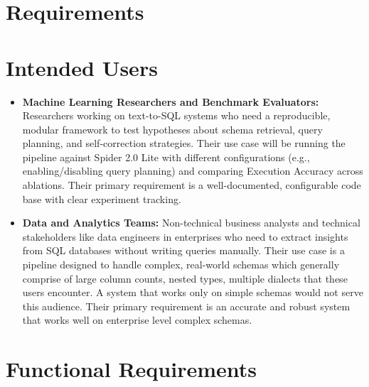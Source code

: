 \section*{\Huge Requirements}

\section{Intended Users}

\begin{itemize}
    \item \textbf{Machine Learning Researchers and Benchmark Evaluators:}
Researchers working on text-to-SQL systems who need a reproducible, modular framework to test hypotheses about schema retrieval, query planning, and self-correction strategies. Their use case will be running the pipeline against Spider 2.0 Lite \cite{lei2024spider} with different configurations (e.g., enabling/disabling query planning) and comparing Execution Accuracy across ablations. Their primary requirement is a well-documented, configurable code base with clear experiment tracking.

\item \textbf{Data and Analytics Teams: }
Non-technical business analysts and technical stakeholders like data engineers in enterprises who need to extract insights from SQL databases without writing queries manually. Their use case is a pipeline designed to handle complex, real-world schemas which generally comprise of large column counts, nested types, multiple dialects that these users encounter. A system that works only on simple schemas would not serve this audience. Their primary requirement is an accurate and robust system that works well on enterprise level complex schemas.
\end{itemize}

\section{Functional Requirements}

